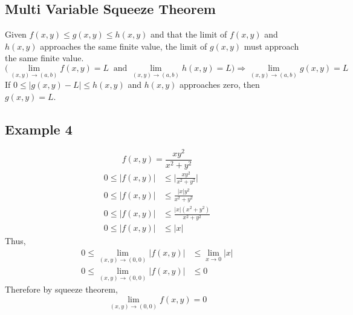 \documentclass{article}
\theoremstyle{mytheoremstyle}
\theoremstyle{mytheoremstyle}
\theoremstyle{myproblemstyle}
\begin{document}
    \subsection*{Multi Variable Squeeze Theorem}
    Given $f(x,y) \le g(x,y) \le h(x,y)$ and that the limit of $f(x,y)$ and
    $h(x,y)$ approaches the same finite value, the limit of $g(x,y)$ must
    approach the same finite value.
    \[
        \Big(\lim_{(x,y)\to(a,b)}f(x,y)=L\ \text{ and } \lim_{(x,y)\to(a,b)}h(x,y)=L\Big)
        \Rightarrow \lim_{(x,y)\to(a,b)}g(x,y)=L
    \]
    If $0\le |g(x,y)-L|\le h(x,y)$ and $h(x,y)$ approaches zero, then
    $g(x,y)=L$.

    \subsection*{Example 4}
    \[
        f(x,y) = \frac{xy^2}{x^2+y^2} 
    \]
    \begin{align*}
        0 \le |f(x,y)| &\le \Big|\frac{xy^2}{x^2+y^2}\Big| \\
        0 \le |f(x,y)| &\le \frac{|x|y^2}{x^2+y^2} \\
        0 \le |f(x,y)| &\le \frac{|x|(x^2+y^2)}{x^2+y^2} \\
        0 \le |f(x,y)| &\le |x|
    \end{align*}
    Thus,
    \begin{align*}
        0 \le \lim_{(x,y)\to (0,0)} |f(x,y)| &\le \lim_{x\to 0} |x| \\
        0 \le \lim_{(x,y)\to (0,0)} |f(x,y)| &\le 0
    \end{align*}
    Therefore by squeeze theorem,
    \[
        \lim_{(x,y)\to (0,0)} f(x,y) = 0
    \]
\end{document}
